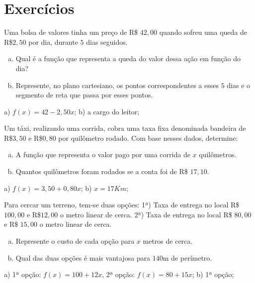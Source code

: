  \section{Exercícios} 
 \begin{exer}
 Uma bolsa de valores tinha um preço de R\$ $42,00$ quando sofreu uma queda de R\$$2,50$ por dia, durante $5$ dias seguidos.
  \begin{enumerate}[a)]
  \item Qual é a função que representa a queda do valor dessa ação em função do dia?
  \item Represente, no plano cartesiano, os pontos correspondentes a esses $5$ dias e o segmento de reta que passa por esses pontos.
  \end{enumerate}
  \end{exer}
  \begin{resp}
    a) $f(x)= 42 - 2,50 x$; b) a cargo do leitor;
  \end{resp}
  
  \begin{exer}
  Um táxi, realizando uma corrida, cobra uma taxa fixa denominada bandeira de R\$$3,50$ e R\$$0,80$ por quilômetro rodado.
  Com base nesses dados, determine:
  \begin{enumerate}[a)]
  \item A função que representa o valor pago por uma corrida de $x$ quilômetros.
  \item Quantos quilômetros foram rodados se a conta foi de R\$ $17,10$.
  \end{enumerate}
  \end{exer}
  \begin{resp}
    a) $f(x)= 3,50 + 0,80 x$; b) $x= 17 Km$;
  \end{resp}
  
  \begin{exer}
  Para cercar um terreno, tem-se duas opções:
  1ª) Taxa de entrega no local R\$ $100,00$ e R\$$12,00$ o metro linear de cerca.
  2ª) Taxa de entrega no local R\$ $80,00$ e R\$ $15,00$ o metro linear de cerca.
  \begin{enumerate}[a)]
  \item Represente o custo de cada opção para $x$ metros de cerca.
  \item Qual das duas opções é mais vantajosa para $140$m de perímetro.
  \end{enumerate}
  \end{exer}
  \begin{resp}
    a) 1ª opção: $f(x)= 100 + 12x$, 2ª opção: $f(x)= 80+15x$; b) 1ª opção; 
  \end{resp}
  
